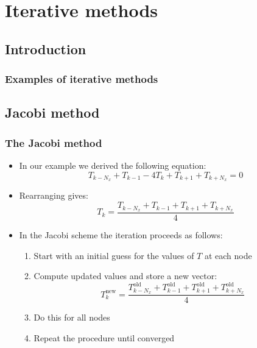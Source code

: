 \section{Iterative methods}
\subsection*{Introduction}

\begin{frame}[fragile]
  \frametitle{Examples of iterative methods}
\end{frame}

\subsection*{Jacobi method}
\begin{frame}[fragile]
  \frametitle{The Jacobi method}
  \begin{itemize}
     \item In our example we derived the following equation:
    \[
     T_{k-N_x} + T_{k-1} - 4T_k + T_{k+1} + T_{k+N_x} = 0
    \]
    \item Rearranging gives:
    \[
      T_k = \frac{T_{k-N_x} + T_{k-1} + T_{k+1} + T_{k+N_x}}{4}
    \]\pause
    \item In the Jacobi scheme the iteration proceeds as follows:
    \begin{enumerate}
      \setlength{\itemindent}{1cm}
      \item Start with an initial guess for the values of $T$ at each node\pause
      \item Compute updated values and store a new vector:
        \[
          T_k^\text{new} = \frac{T_{k-N_x}^\text{old} + T_{k-1}^\text{old} + T_{k+1}^\text{old} + T_{k+N_x}^\text{old}}{4}
        \]\pause
      \item Do this for all nodes\pause
      \item Repeat the procedure until converged
    \end{enumerate}
  \end{itemize}
\end{frame}

